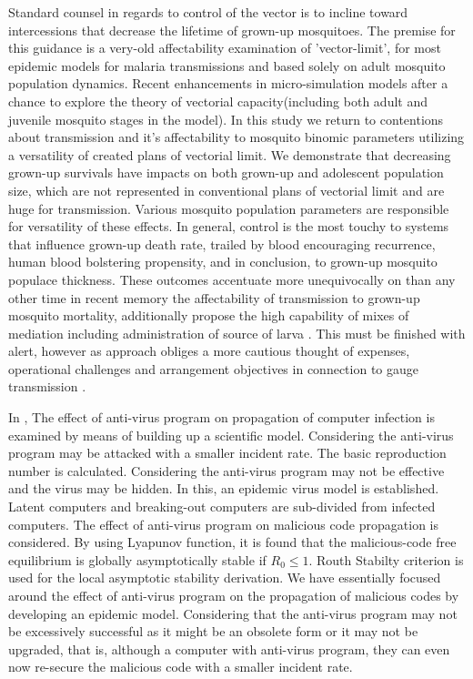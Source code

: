 Standard counsel in regards to control of the vector is to incline toward intercessions that decrease the lifetime of grown-up mosquitoes. The premise for this guidance is a very-old affectability examination of 'vector-limit', for most epidemic models for malaria transmissions and based solely on adult mosquito population dynamics. Recent enhancements in micro-simulation models after a chance to explore the theory of vectorial capacity(including both adult and juvenile mosquito stages in the model).
In this study we return to contentions about transmission and it's affectability to mosquito binomic parameters utilizing a versatility of created plans of vectorial limit.
We demonstrate that decreasing grown-up survivals have impacts on both grown-up and adolescent population size, which are not represented in conventional plans of vectorial limit and are huge for transmission. Various mosquito population parameters are responsible for versatility of these effects. In general, control is the most touchy to systems that influence grown-up death rate, trailed by blood encouraging recurrence, human blood bolstering propensity, and in conclusion, to grown-up mosquito populace thickness.
These outcomes accentuate more unequivocally on than any other time in recent memory the affectability of transmission to grown-up mosquito mortality, additionally propose the high capability of mixes of mediation including administration of source of larva . This must be finished with alert, however as approach obliges a more cautious thought of expenses, operational challenges and arrangement objectives in connection to gauge transmission \cite{brady2015editor}.


In \cite{sun2014impact}, The effect of anti-virus program on propagation of computer infection is examined by means of building up a scientific model. Considering the anti-virus program may be attacked with a smaller incident rate. The basic reproduction number is calculated. Considering the anti-virus program may not be effective and the virus may be hidden. In this, an epidemic virus model is established. Latent computers and breaking-out computers are sub-divided from infected computers. The effect of anti-virus program on malicious code propagation is considered. By using Lyapunov function, it is found that the malicious-code free equilibrium is globally asymptotically stable if $R_0 \leq 1$. Routh Stabilty criterion is used for the local asymptotic stability derivation. We have essentially focused around the effect of anti-virus program on the propagation of malicious codes by developing an epidemic model. Considering that the anti-virus program may not be excessively successful as it might be an obsolete form or it may not be upgraded, that is, although a computer with anti-virus program, they can even now re-secure the malicious code with a smaller incident rate.


